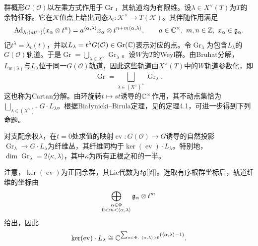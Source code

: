 群概形$G(\mathcal O)$以左乘方式作用于$\operatorname{Gr}$，其轨道均为有限维。设$\lambda\in X^\vee(T)$为$T$的余特征标。它在$\mathcal K$值点上给出同态$\lambda_t:\mathcal K^\times\to T(\mathcal K)$。其伴随作用满足
\[\operatorname{Ad}_{\lambda_t(at^m)}(x_\alpha\otimes t^n)=a^{\langle\alpha,\lambda\rangle}x_\alpha\otimes t^{n+m\langle\alpha,\lambda\rangle},\qquad a\in\C^\times,\ m,n\in\Z,\ x_\alpha\in\g_\alpha.\]
记$t^\lambda=\lambda_t(t)$，并以$L_\lambda=t^\lambda G(\mathcal O)\in\operatorname{Gr}(\mathbb{C})$表示对应的点。令$\operatorname{Gr}_\lambda$为包含$L_\lambda$的$G(\mathcal O)$轨道。于是$\operatorname{Gr}=\bigcup_{\lambda\in X^\vee}\operatorname{Gr}_\lambda$。设$W$为$T$的Weyl群。由Bruhat分解，$L_{w(\lambda)}$与$L_\lambda$位于同一$G(\mathcal O)$轨道，因此这些轨道由$X^\vee(T)$中的$W$轨道参数化，即
\[\operatorname{Gr}=\bigsqcup_{\lambda\in(X^\vee)^+}\operatorname{Gr}_\lambda.\]
这也称为Cartan分解。由环旋转$t\mapsto st$诱导的$\mathbb{C}^\times$作用，其不动点集恰为$\bigsqcup_{\lambda\in(X^\vee)^+}G\cdot L_\lambda$。根据Białynicki–Birula定理，见的定理4.1，可进一步得到下列命题。
\begin{proposition}\label{L21S2O1}
对支配余权$\lambda$，在$t=0$处求值的映射$\operatorname{ev}:G(\mathcal O)\to G$诱导的自然投影$\operatorname{Gr}_\lambda\to G\cdot L_\lambda$为纤维丛，其纤维同构于$\ker(\operatorname{ev})\cdot L_\lambda$。特别地，$\dim\operatorname{Gr}_\lambda=2\langle\kappa,\lambda\rangle$，其中$\kappa$为所有正根之和的一半。
\end{proposition}
注意，$\ker(\operatorname{ev})$为正同余群，其Lie代数为$t\mathfrak{g}[[t]]$。选取有序根群坐标后，轨道纤维的坐标由
\[\bigoplus_{\substack{\alpha\in\Phi\\0<m<\langle\alpha,\lambda\rangle}}\mathfrak{g}_\alpha\otimes t^m\]
给出，因此
\[\ker(\operatorname{ev})\cdot L_\lambda\cong\C^{\sum_{\alpha\in\Phi,\ \langle\alpha,\lambda\rangle>0}(\langle\alpha,\lambda\rangle-1)}.\]
